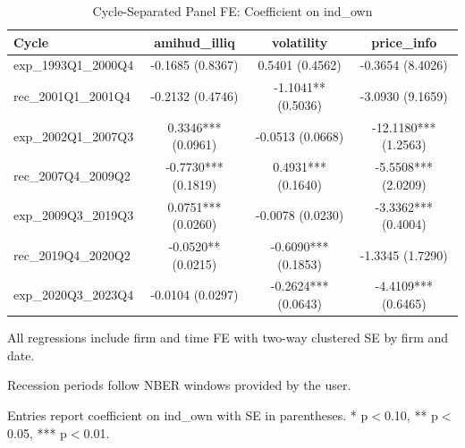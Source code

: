 \begin{table}[!htbp]\centering
\caption{Cycle-Separated Panel FE: Coefficient on ind_own}
\label{tab:cycle_sep_indown}
\begin{tabular}{lccc}
\toprule
Cycle & amihud_illiq & volatility & price_info \\
\midrule
exp_1993Q1_2000Q4 & -0.1685 (0.8367) & 0.5401 (0.4562) & -0.3654 (8.4026) \\
rec_2001Q1_2001Q4 & -0.2132 (0.4746) & -1.1041** (0.5036) & -3.0930 (9.1659) \\
exp_2002Q1_2007Q3 & 0.3346*** (0.0961) & -0.0513 (0.0668) & -12.1180*** (1.2563) \\
rec_2007Q4_2009Q2 & -0.7730*** (0.1819) & 0.4931*** (0.1640) & -5.5508*** (2.0209) \\
exp_2009Q3_2019Q3 & 0.0751*** (0.0260) & -0.0078 (0.0230) & -3.3362*** (0.4004) \\
rec_2019Q4_2020Q2 & -0.0520** (0.0215) & -0.6090*** (0.1853) & -1.3345 (1.7290) \\
exp_2020Q3_2023Q4 & -0.0104 (0.0297) & -0.2624*** (0.0643) & -4.4109*** (0.6465) \\
\bottomrule
\end{tabular}
\begin{tablenotes}\footnotesize
\item All regressions include firm and time FE with two-way clustered SE by firm and date.
\item Recession periods follow NBER windows provided by the user.
\item Entries report coefficient on ind_own with SE in parentheses. * p$<$0.10, ** p$<$0.05, *** p$<$0.01.
\end{tablenotes}
\end{table}
